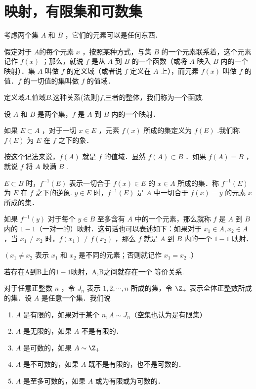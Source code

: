 \section{映射，有限集和可数集}
\begin{definition}
	考虑两个集 $A$ 和 $B$ ，它们的元素可以是任何东西．
	
	假定对于 $A$的每个元素 $x$ ，按照某种方式，与集 $B$ 的一个元素联系着，这个元素记作 $f(x)$ ；那么，就说 $f$ 是从 $A$ 到 $B$ 的一个函数（或将 $A$ 映入 $B$ 内的一个映射）．集 $A$ 叫做 $f$ 的定义域（或者说 $f$ 定义在 $A$ 上），而元素 $f(x)$ 叫做 $f$ 的值．$f$ 的一切值的集叫做 $f$ 的值域．
	
	定义域$A$,值域$B$,这种关系(法则)$f$,三者的整体，我们称为一个函数.
	
\end{definition}
\begin{definition}
	设 $A$ 和 $B$ 是两个集，$f$ 是 $A$ 到 $B$ 内的一个映射．
	
	如果 $E \subset A$ ，对于一切 $x \in E$ ，元素 $f(x)$ 所成的集定义为 $f(E)$ .我们称 $f(E)$ 为 $E$ 在 $f$ 之下的象．
	
	按这个记法来说，$f(A)$ 就是 $f$ 的值域．显然 $f(A) \subset B$ ．如果 $f(A)=B$ ，就说 $f$ 将 $A$ 映满 $B$ .
	
	$E \subset B$ 时，$f^{-1}(E)$ 表示一切合于 $f(x) \in E$ 的 $x \in A$ 所成的集．称 $f^{-1}(E)$ 为 $E$ 在 $f$ 之下的逆象. $y \in E$ 时，$f^{-1}(E)$ 是 $A$ 中一切合于 $f(x)=y$ 的元素 $x$ 所成的集．
	
	如果 $f^{-1}(y)$ 对于每个 $y \in B$ 至多含有 $A$ 中的一个元素，那么就称 $f$ 是 $A$ 到 $B$内的 $1-1$（一对一的）映射．这句话也可以表述如下：如果对于 $x_1 \in A, x_2 \in A$ ，当 $x_1 \neq x_2$ 时，$f\left(x_1\right) \neq f\left(x_2\right)$ ，那么 $f$ 就是 $A$ 到 $B$ 内的一个 $1-1$ 映射．
	
	
	$\left(x_1 \neq x_2\right.$ 表示 $x_1$ 和 $x_2$ 是不同的元素；否则就记作 $x_1=x_2$ .）
\end{definition}
\begin{definition}
	若存在A到B上的$1-1$映射，A,B之间就存在一个 等价关系.
\end{definition}
\begin{definition}
	对于任意正整数 $n$ ，令 $J_n$ 表示 $1,2, \cdots, n$ 所成的集，令 $\Z_+$ 表示全体正整数所成的集．设 $A$ 是任意一个集．我们说
	\begin{enumerate}
		\item $A$ 是有限的，如果对于某个 $n, A \sim J_n$（空集也认为是有限集）
		\item $A$ 是无限的，如果 $A$ 不是有限的．
		\item $A$ 是可数的，如果 $A \sim \Z_+$
		\item $A$ 是不可数的，如果 $A$ 既不是有限的，也不是可数的．
		\item $A$ 是至多可数的，如果 $A$ 或为有限或为可数的．
	\end{enumerate}
	
\end{definition}
